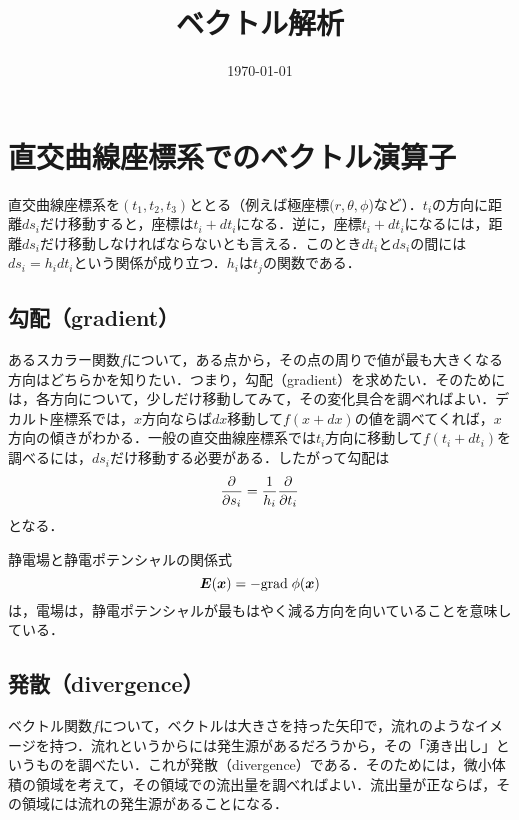 \documentclass[a4paper,10pt,uplatex]{jsarticle}
\renewcommand{\grad}{\mathrm{grad}\;}
\newcommand{\E}{\vb*{E}}
\newcommand{\x}{\vb*{x}}
\begin{document}
\title{ベクトル解析}
\author{}
\date{\today}
\maketitle

\section{直交曲線座標系でのベクトル演算子}
直交曲線座標系を$(t_1, t_2, t_3)$ととる（例えば極座標$(r,\theta,\phi$)など）．$t_i$の方向に距離$ds_i$だけ移動すると，座標は$t_i+dt_i$になる．逆に，座標$t_i + dt_i$になるには，距離$ds_i$だけ移動しなければならないとも言える．このとき$dt_i$と$ds_i$の間には$ds_i = h_i dt_i$という関係が成り立つ．$h_i$は$t_j$の関数である．

\subsection{勾配（gradient）}
あるスカラー関数$f$について，ある点から，その点の周りで値が最も大きくなる方向はどちらかを知りたい．つまり，勾配（gradient）を求めたい．そのためには，各方向について，少しだけ移動してみて，その変化具合を調べればよい．デカルト座標系では，$x$方向ならば$dx$移動して$f(x+dx)$の値を調べてくれば，$x$方向の傾きがわかる．一般の直交曲線座標系では$t_i$方向に移動して$f(t_i+dt_i)$を調べるには，$ds_i$だけ移動する必要がある．したがって勾配は
\begin{equation}
    \pdv{s_i} = \frac{1}{h_i}\pdv{t_i}
\end{equation}
となる．

静電場と静電ポテンシャルの関係式
\begin{equation}
    \E(\x) = -\grad \phi(\x)
\end{equation}
は，電場は，静電ポテンシャルが最もはやく減る方向を向いていることを意味している．

\subsection{発散（divergence）}
ベクトル関数$f$について，ベクトルは大きさを持った矢印で，流れのようなイメージを持つ．流れというからには発生源があるだろうから，その「湧き出し」というものを調べたい．これが発散（divergence）である．そのためには，微小体積の領域を考えて，その領域での流出量を調べればよい．流出量が正ならば，その領域には流れの発生源があることになる．
\end{document}
